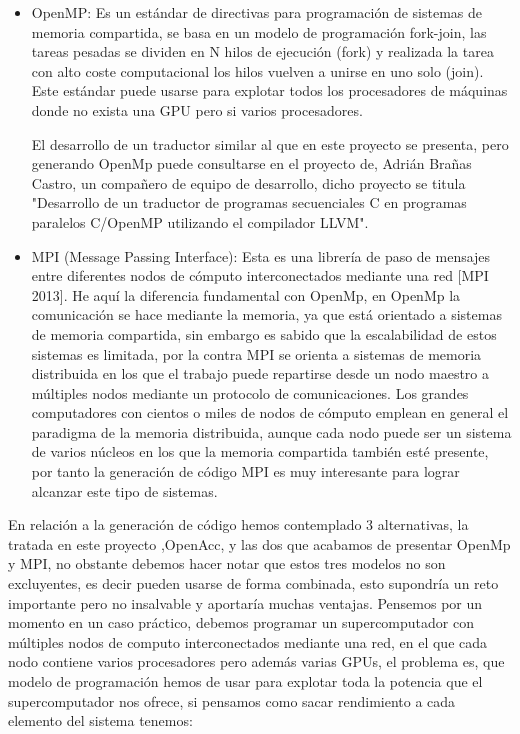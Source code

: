 \begin{itemize}

\item OpenMP: Es un estándar de directivas para programación de sistemas de memoria compartida, se basa en un modelo de programación fork-join, las tareas pesadas se dividen en N hilos de ejecución (fork) y realizada la tarea con alto coste computacional los hilos vuelven a unirse en uno solo (join). Este estándar puede usarse para explotar todos los procesadores de máquinas donde no exista una GPU pero si varios procesadores.

El desarrollo de un traductor similar al que en este proyecto se presenta, pero generando OpenMp puede consultarse en el proyecto de, Adrián Brañas Castro, un compañero de equipo de desarrollo, dicho proyecto se titula "Desarrollo de un traductor de programas secuenciales C en programas paralelos C/OpenMP utilizando el compilador LLVM".


\item MPI (Message Passing Interface): Esta es una librería de paso de mensajes entre diferentes nodos de cómputo interconectados mediante una red [MPI 2013]. He aquí la diferencia fundamental con OpenMp, en OpenMp la comunicación se hace mediante la memoria, ya que está orientado a sistemas de memoria compartida, sin embargo es sabido que la escalabilidad de estos sistemas es limitada, por la contra MPI se orienta a sistemas de memoria distribuida en los que el trabajo puede repartirse desde un nodo maestro a múltiples nodos mediante un protocolo de comunicaciones. Los grandes computadores con cientos o miles de nodos de cómputo emplean en general el paradigma de la memoria distribuida, aunque cada nodo puede ser un sistema de varios núcleos en los que la memoria compartida también esté presente, por tanto la generación de código MPI es muy interesante para lograr alcanzar este tipo de sistemas.

\end{itemize}

En relación a la generación de código hemos contemplado 3 alternativas, la tratada en este proyecto ,OpenAcc, y las dos que acabamos de presentar OpenMp y MPI, no obstante debemos hacer notar que estos tres modelos no son excluyentes, es decir pueden usarse de forma combinada, esto supondría un reto importante pero no insalvable y aportaría muchas ventajas. 
Pensemos por un momento en un caso práctico, debemos programar un supercomputador con múltiples nodos de computo interconectados mediante una red, en el que cada nodo contiene varios procesadores pero además varias GPUs, el problema es, que modelo de programación hemos de usar para explotar toda la potencia que el supercomputador nos ofrece, si pensamos como sacar rendimiento a cada elemento del sistema tenemos:


